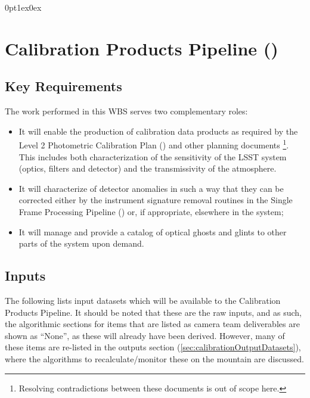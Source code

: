 \titlespacing*{\subsubsection}
{0pt}{1ex}{0ex}


\section{Calibration Products Pipeline (\wbsCPP)}

\subsection{Key Requirements}

The work performed in this WBS serves two complementary roles:

\begin{itemize}
  \item{It will enable the production of calibration data products as required by the Level 2 Photometric Calibration Plan (\NewPCP{}) and other planning documents \cite{Lupton15}\footnote{Resolving contradictions between these documents is out of scope here.}. This includes both characterization of the sensitivity of the LSST system (optics, filters and detector) and the transmissivity of the atmosphere.}
  \item{It will characterize of detector anomalies in such a way that they can be corrected either by the instrument signature removal routines in the Single Frame Processing Pipeline (\wbsSFM) or, if appropriate, elsewhere in the system;}
  \item{It will manage and provide a catalog of optical ghosts and glints to other parts of the system upon demand.}
\end{itemize}



\subsection{Inputs}
\label{sec:calibInputs} 
The following lists input datasets which will be available to the Calibration Products Pipeline. It should be noted that these are the raw inputs, and as such, the algorithmic sections for items that are listed as camera team deliverables are shown as ``None'', as these will already have been derived. However, many of these items are re-listed in the outputs section (\ref{sec:calibrationOutputDatasets}), where the algorithms to recalculate/monitor these on the mountain are discussed.


